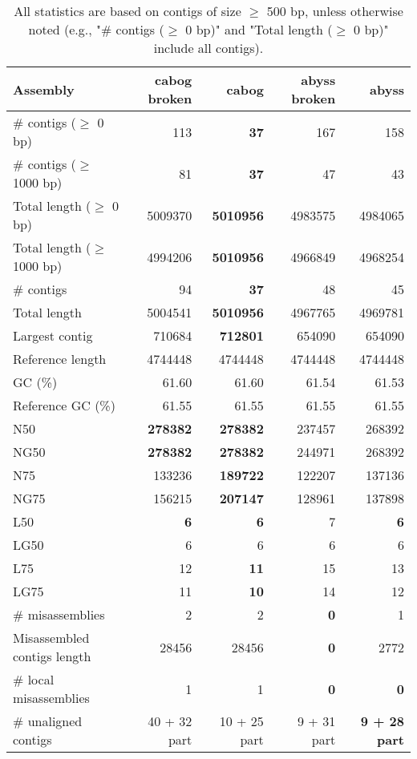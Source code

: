 \documentclass[12pt,a4paper]{article}
\begin{document}
\begin{table}[ht]
\begin{center}
\caption{All statistics are based on contigs of size $\geq$ 500 bp, unless otherwise noted (e.g., "\# contigs ($\geq$ 0 bp)" and "Total length ($\geq$ 0 bp)" include all contigs).}
\begin{tabular}{|l*{4}{|r}|}
\hline
Assembly & cabog broken & cabog & abyss broken & abyss \\ \hline
\# contigs ($\geq$ 0 bp) & 113 & {\bf 37} & 167 & 158 \\ \hline
\# contigs ($\geq$ 1000 bp) & 81 & {\bf 37} & 47 & 43 \\ \hline
Total length ($\geq$ 0 bp) & 5009370 & {\bf 5010956} & 4983575 & 4984065 \\ \hline
Total length ($\geq$ 1000 bp) & 4994206 & {\bf 5010956} & 4966849 & 4968254 \\ \hline
\# contigs & 94 & {\bf 37} & 48 & 45 \\ \hline
Total length & 5004541 & {\bf 5010956} & 4967765 & 4969781 \\ \hline
Largest contig & 710684 & {\bf 712801} & 654090 & 654090 \\ \hline
Reference length & 4744448 & 4744448 & 4744448 & 4744448 \\ \hline
GC (\%) & 61.60 & 61.60 & 61.54 & 61.53 \\ \hline
Reference GC (\%) & 61.55 & 61.55 & 61.55 & 61.55 \\ \hline
N50 & {\bf 278382} & {\bf 278382} & 237457 & 268392 \\ \hline
NG50 & {\bf 278382} & {\bf 278382} & 244971 & 268392 \\ \hline
N75 & 133236 & {\bf 189722} & 122207 & 137136 \\ \hline
NG75 & 156215 & {\bf 207147} & 128961 & 137898 \\ \hline
L50 & {\bf 6} & {\bf 6} & 7 & {\bf 6} \\ \hline
LG50 & 6 & 6 & 6 & 6 \\ \hline
L75 & 12 & {\bf 11} & 15 & 13 \\ \hline
LG75 & 11 & {\bf 10} & 14 & 12 \\ \hline
\# misassemblies & 2 & 2 & {\bf 0} & 1 \\ \hline
Misassembled contigs length & 28456 & 28456 & {\bf 0} & 2772 \\ \hline
\# local misassemblies & 1 & 1 & {\bf 0} & {\bf 0} \\ \hline
\# unaligned contigs & 40 + 32 part & 10 + 25 part & 9 + 31 part & {\bf 9 + 28 part} \\ \hline

\end{tabular}
\end{center}
\end{table}
\end{document}
